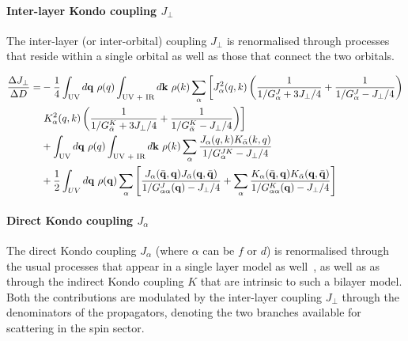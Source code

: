 \documentclass[%
reprint,
superscriptaddress,
groupedaddress,
superscriptaddress,
onecolumn,
10pt
]{revtex4-2}
\begin{document}
\paragraph{Inter-layer Kondo coupling \(J_\perp\)}
The inter-layer (or inter-orbital) coupling \(J_\perp\) is renormalised through processes that reside within a single orbital as well as those that connect the two orbitals. 

\begin{equation}\begin{aligned}
	\frac{\Delta J_\perp}{\Delta D} =& -\frac{1}{4}\int_\text{UV} d{\bf q}~\rho(q) \int_\text{UV + IR} d{\bf k}~\rho(k) \sum_\alpha \left[J_\alpha^2(q,k)\left(\frac{1}{1/G_\alpha^J + 3J_\perp/4} + \frac{1}{1/G_\alpha^J - J_\perp/4}\right)\right.\\
									 &\left. K_\alpha^2(q,k)\left(\frac{1}{1/G_{\bar\alpha}^K + 3J_\perp/4} + \frac{1}{1/G_{\bar\alpha}^K - J_\perp/4}\right)\right]\\
									 &+ \int_\text{UV} d{\bf q}~\rho(q) \int_\text{UV + IR} d{\bf k}~\rho(k)\sum_\alpha \frac{J_\alpha(q,k)K_{\bar\alpha}(k, q)}{1/G^{JK}_\alpha - J_\perp/4}\\
									 &+ \frac{1}{2} \int_{UV} d{\bf q} ~\rho({\bf q}) \sum_\alpha \left[\frac{J_\alpha(\bar{\bf q},{\bf q}) J_{\bar\alpha}({\bf q},\bar{\bf q})}{1/G^J_{\alpha\alpha}({\bf q}) - J_\perp/4} + \sum_\alpha \frac{K_\alpha(\bar{\bf q},{\bf q}) K_{\bar\alpha}({\bf q},\bar{\bf q})}{1/G^K_{\alpha\alpha}({\bf q}) - J_\perp/4}\right]
\end{aligned}\end{equation}

\paragraph{Direct Kondo coupling \(J_\alpha\)}
The direct Kondo coupling \(J_\alpha\) (where \(\alpha\) can be \(f\) or \(d\)) is renormalised through the usual processes that appear in a single layer model as well~\cite{mukherjee2026}, as well as as through the indirect Kondo coupling \(K\) that are intrinsic to such a bilayer model. Both the contributions are modulated by the inter-layer coupling \(J_\perp\) through the denominators of the propagators, denoting the two branches available for scattering in the spin sector.
\end{document}
